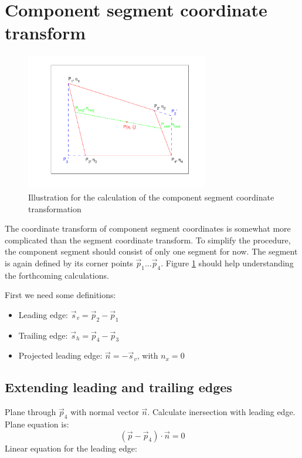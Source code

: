 \section{Component segment coordinate transform}
%
\begin{figure}[htb]
  \centering
  \includegraphics[trim=1cm 1cm 1cm 0.5cm, clip=true,width = 8cm]{gfx/compSegTheo}
	\caption{Illustration for the calculation of the component segment coordinate transformation}
	\label{fig:cs_surf}
\end{figure}
%
The coordinate transform of component segment coordinates is somewhat more complicated than the segment coordinate transform. To simplify the procedure, the component segment should consist of only one segment for now. The segment is again defined by its corner points $\vec p_1 \dots \vec p_4$. Figure \ref{fig:cs_surf} should help understanding the forthcoming calculations. \par
First we need some definitions:
\begin{itemize}
	\item Leading edge:  $ \vec s_v = \vec p_2 - \vec p_1 $
	\item Trailing edge: $ \vec s_h = \vec p_4 - \vec p_3 $
	\item Projected leading edge:   $\vec n = -\vec s_v$, with $n_x = 0$  
\end{itemize}


\subsection{Extending leading and trailing edges}
Plane through $\vec p_4$ with normal vector $\vec n$. Calculate inersection with leading edge. Plane equation is:
\begin{equation}
(\vec p - \vec p_4) \cdot \vec n = 0
\label{eq:plane}
\end{equation}
 Linear equation for the leading edge:
 
